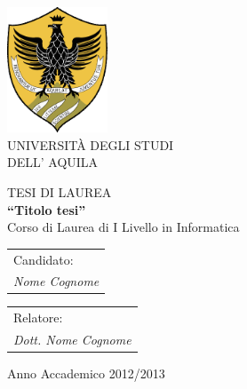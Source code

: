 


   
\thispagestyle{empty}
\begin{center}

        \includegraphics[width=3cm]{images/logo}\\
\vspace{1cm}      
       {\Huge UNIVERSIT\`A DEGLI STUDI}\\
        \vspace{8mm}                                                  %
        {\Huge DELL' AQUILA}\\
        \vspace{1.3cm}                                                  
        \vspace{2.2cm}                                                    

         {\Large TESI DI LAUREA} \\

        \vspace{8mm}
        {\LARGE \bfseries ``Titolo tesi''} \\
        \vspace{2.8cm}
       {\large Corso di Laurea di I Livello in Informatica}\\
        \vspace{18mm}
    \end{center}
\vspace{20mm}
   \begin{tabular}{l}
        { Candidato:}\\
        { \textit{Nome Cognome}}\\
    \end{tabular}
    \hfill
    \begin{tabular}{l}
        { Relatore:}\\
        { \textit{Dott.  Nome Cognome}}\\
    \end{tabular}
\vspace{20mm}
\begin{center}
{\large Anno Accademico 2012/2013}
\end{center}
